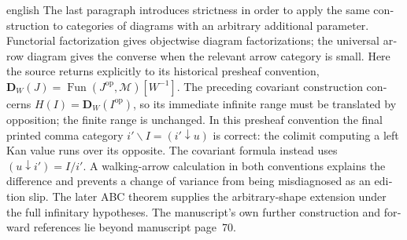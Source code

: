 \begin{otherlanguage}{english}
\begin{otherlanguage*}{english}
The last paragraph introduces strictness in order to apply the same construction to categories of diagrams with an arbitrary additional parameter. Functorial factorization gives objectwise diagram factorizations; the universal arrow diagram gives the converse when the relevant arrow category is small. Here the source returns explicitly to its historical presheaf convention, $\mathbf D_W(J)=\operatorname{Fun}(J^{\mathrm{op}},\mathcal M)[W^{-1}]$. The preceding covariant construction concerns $H(I)=\mathbf D_W(I^{\mathrm{op}})$, so its immediate infinite range must be translated by opposition; the finite range is unchanged. In this presheaf convention the final printed comma category $i'\backslash I=(i'\downarrow u)$ is correct: the colimit computing a left Kan value runs over its opposite. The covariant formula instead uses $(u\downarrow i')=I/i'$. A walking-arrow calculation in both conventions explains the difference and prevents a change of variance from being misdiagnosed as an edition slip. The later ABC theorem supplies the arbitrary-shape extension under the full infinitary hypotheses. The manuscript's own further construction and forward references lie beyond manuscript page~70.
\end{otherlanguage*}
\end{otherlanguage}
\dgrchunkend
